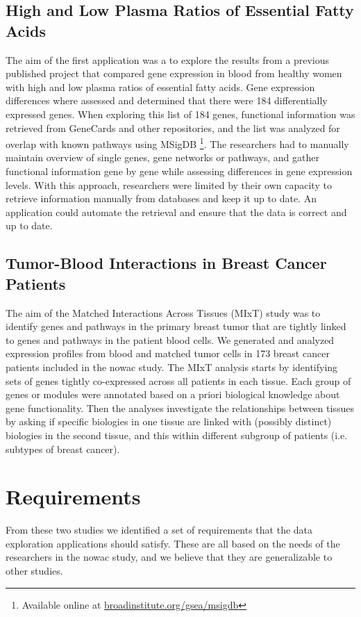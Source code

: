 \subsection{High and Low Plasma Ratios of Essential Fatty Acids} 
The aim of the first application was a to explore the results from a previous
published project that compared gene expression in blood from healthy women with
high and low plasma ratios of essential fatty acids.\cite{olsen2013plasma}  Gene
expression differences where assessed and determined that there were 184
differentially expressed genes. When exploring this list of 184 genes,
functional information was retrieved from GeneCards and other repositories, and
the list was analyzed for overlap with known pathways using MSigDB
\footnote{Available online at
\href{broadinstitute.org/gsea/msigdb}{broadinstitute.org/gsea/msigdb}}. The
researchers had to manually maintain overview of single genes, gene networks or
pathways, and gather functional information gene by gene while assessing
differences in gene expression levels. With this approach, researchers were
limited by their own capacity to retrieve information manually from databases
and keep it up to date. An application could automate the retrieval and ensure
that the data is correct and up to date. 

\subsection{Tumor-Blood Interactions in Breast Cancer Patients}
The aim of the Matched Interactions Across Tissues (MIxT) study was to identify
genes and pathways in the primary breast tumor that are tightly linked to genes
and pathways in the patient blood cells.\cite{dumeaux2017interactions} We
generated and analyzed expression profiles from blood and matched tumor cells in
173 breast cancer patients included in the \gls{nowac} 
study.  The MIxT analysis starts by identifying sets of genes tightly
co-expressed across all patients in each tissue. Each group of genes or modules
were annotated based on a priori biological knowledge about gene functionality.
Then the analyses investigate the relationships between tissues by asking if
specific biologies in one tissue are linked with (possibly distinct) biologies
in the second tissue, and this within different subgroup of patients (i.e.
subtypes of breast cancer).

\section{Requirements} 
From these two studies we identified a set of requirements that the data
exploration applications should satisfy. These are all based on the needs of the
researchers in the \gls{nowac} study, and we believe that they are generalizable
to other studies. 

